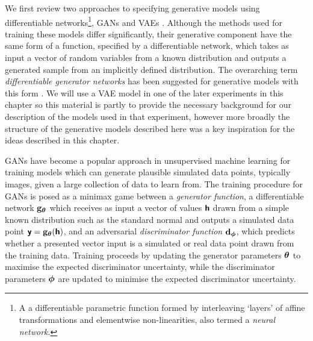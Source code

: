 We first review two approaches to specifying generative models using differentiable networks\footnote{A a differentiable parametric function formed by interleaving `layers' of affine transformations and elementwise non-linearities, also termed a \emph{neural network}.}, \acfp{GAN} \citep{goodfellow2014generative} and \acfp{VAE} \citep{kingma2013auto,rezende2014stochastic}. Although the methods used for training these models differ significantly, their generative component have the same form of a function, specified by a differentiable network, which takes as input a vector of random variables from a known distribution and outputs a generated sample from an implicitly defined distribution. The overarching term \emph{differentiable generator networks} has been suggested for generative models with this form \citep{goodfellow2016deep}. We will use a \ac{VAE} model in one of the later experiments in this chapter so this material is partly to provide the necessary background for our description of the models used in that experiment, however more broad\-ly the structure of the generative models described here was a key inspiration for the ideas described in this chapter.

\acp{GAN} \citep{goodfellow2014generative} have become a popular approach in unsupervised machine learning for training models which can generate plausible simulated data points, typically images, given a large collection of data to learn from. The training procedure for \acp{GAN} is posed as a minimax game between a \emph{generator function}, a differentiable network ${\mathbf{g}}_{\boldsymbol{\theta}}$ which receives as input a vector of values $\boldsymbol{\mathsf{h}}$ drawn from a simple known distribution such as the standard normal and outputs a simulated data point $\boldsymbol{\mathsf{y}} = {\mathbf{g}}_{\boldsymbol{\theta}}(\boldsymbol{\mathsf{h}})$, and an adversarial \emph{discriminator function} ${\mathbf{d}}_{\boldsymbol{\phi}}$, which predicts whether a presented vector input is a simulated or real data point drawn from the training data.  Training proceeds by updating the generator parameters $\boldsymbol{\theta}$ to maximise the expected discriminator uncertainty, while the discriminator parameters $\boldsymbol{\phi}$ are updated to minimise the expected discriminator uncertainty.

